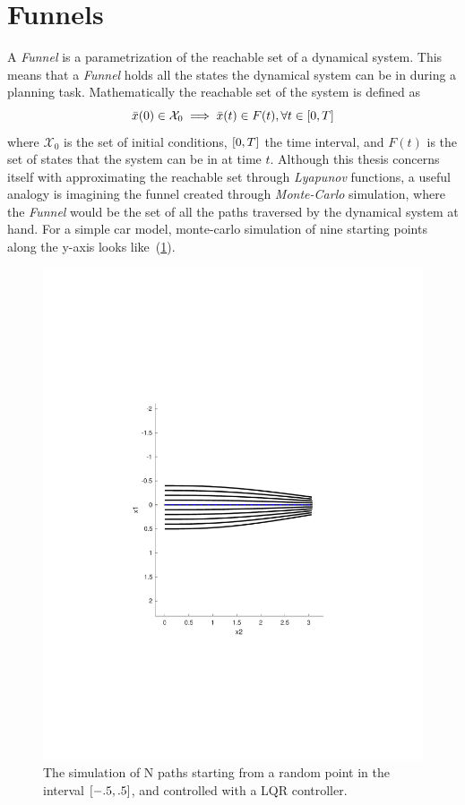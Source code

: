 \section{Funnels}

A \textit{Funnel} is a parametrization of the reachable set of a dynamical
system. This means that a \textit{Funnel} holds all the states the dynamical
system can be in during a planning task. Mathematically the reachable set of the
system is defined as
\[
  \bar{x}(0) \in \mathcal{X}_0 \implies \bar{x}(t) \in F(t), \forall t \in
  \lbrack0,T\rbrack
\]
where \(\mathcal{X}_0\) is the set of initial conditions, \(\lbrack0,T\rbrack\) the time
interval, and \(F(t)\) is the set of states that the system can be in at time
\(t\). Although this thesis concerns itself with approximating the reachable set
through \textit{Lyapunov} functions, a useful analogy is imagining the funnel
created through \textit{Monte-Carlo} simulation, where the \textit{Funnel} would
be the set of all the paths traversed by the dynamical system at hand. For a
simple car model, monte-carlo simulation of nine starting points along the
y-axis looks like~(\ref{fig:monte-carlo-sim}).

\begin{figure}
  \centering \includegraphics[scale=.5]{figures/preliminaries/montecarlofunnel}
  \caption{The simulation of N paths starting from a random point in the
    interval \(\lbrack-.5,.5\rbrack\), and controlled with a LQR controller.}
  \label{fig:monte-carlo-sim}
\end{figure}


